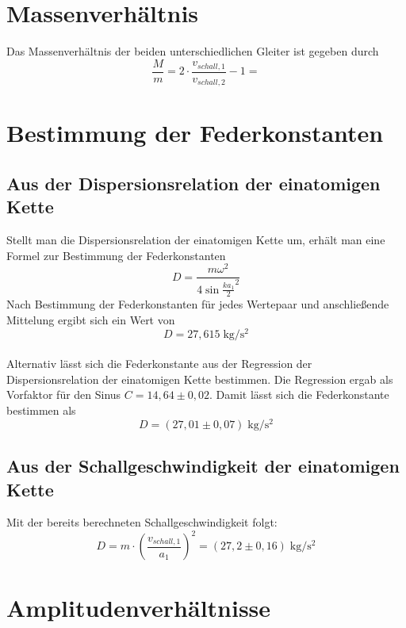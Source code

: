 \section{Massenverhältnis}

Das Massenverhältnis der beiden unterschiedlichen Gleiter ist gegeben durch
\begin{equation}
	\frac{M}{m} = 2\cdot\frac{v_{schall,1}}{v_{schall,2}} - 1 = 
\end{equation}

\section{Bestimmung der Federkonstanten}
\subsection{Aus der Dispersionsrelation der einatomigen Kette}

Stellt man die Dispersionsrelation der einatomigen Kette um, erhält man eine Formel zur Bestimmung der Federkonstanten
\begin{equation}
	D = \frac{m\omega^2}{4\sin{\frac{ka_1}{2}^2}}
\end{equation}
Nach Bestimmung der Federkonstanten für jedes Wertepaar und anschließende Mittelung ergibt sich ein Wert von
\begin{equation}
	D = 27,615\;\si{\kilogram\per\square\second}
\end{equation}\\
Alternativ lässt sich die Federkonstante aus der Regression der Dispersionsrelation der einatomigen Kette bestimmen.
Die Regression ergab als Vorfaktor für den Sinus $C = 14,64 \pm 0,02$. Damit lässt sich die Federkonstante bestimmen als
\begin{equation}
	D = (27,01 \pm 0,07)\;\si{\kilogram\per\square\second}
\end{equation}

\subsection{Aus der Schallgeschwindigkeit der einatomigen Kette}

Mit der bereits berechneten Schallgeschwindigkeit folgt:
\begin{equation}
	D = m\cdot\left(\frac{v_{schall,1}}{a_1}\right)^2 = (27,2 \pm 0,16)\;\si{\kilogram\per\square\second}
\end{equation}

\section{Amplitudenverhältnisse}



